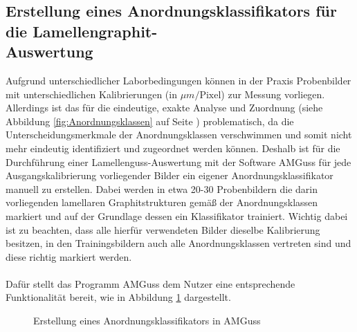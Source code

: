 \documentclass[
fontsize=10pt, 
listof = totoc,
parskip = half	
]{report}
\begin{document}
\subsection{Erstellung eines Anordnungsklassifikators für die Lamellengraphit-\\Auswertung}
\label{subsec: ErstellungAnordnungsklassifAMGuss}

\noindent Aufgrund unterschiedlicher Laborbedingungen können in der Praxis Probenbilder mit unterschiedlichen Kalibrierungen (in $\mu m/\text{Pixel}$) zur Messung vorliegen. Allerdings ist das für die eindeutige, exakte Analyse und Zuordnung (siehe Abbildung \ref{fig:Anordnungsklassen} auf Seite \pageref{fig:Anordnungsklassen}) problematisch, da die Unterscheidungsmerkmale der Anordnungsklassen verschwimmen und somit nicht mehr eindeutig identifiziert und zugeordnet werden können. Deshalb ist für die Durchführung einer Lamellenguss-Auswertung mit der Software AMGuss für jede Ausgangskalibrierung vorliegender Bilder ein eigener Anordnungsklassifikator manuell zu erstellen. Dabei werden in etwa 20-30 Probenbildern die darin vorliegenden lamellaren Graphitstrukturen gemäß der Anordnungsklassen markiert und auf der Grundlage dessen ein Klassifikator trainiert. Wichtig dabei ist zu beachten, dass alle hierfür verwendeten Bilder dieselbe Kalibrierung besitzen, in den Trainingsbildern auch alle Anordnungsklassen vertreten sind und diese richtig markiert werden.
\\\\
Dafür stellt das Programm AMGuss dem Nutzer eine entsprechende Funktionalität bereit, wie in Abbildung \ref{fig:ErstAnordnungsklass} dargestellt.


\begin{figure}[H]
	\centering
	\caption{Erstellung eines Anordnungsklassifikators in AMGuss}
	\label{fig:ErstAnordnungsklass}
\end{figure}
\end{document}
